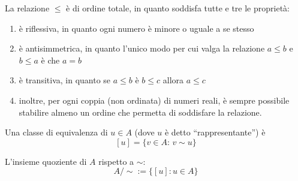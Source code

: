 {\begin{itemize}
        La relazione $ \le $ è di ordine totale, in quanto soddisfa tutte e tre le proprietà:
        \begin{enumerate}
            \item è riflessiva, in quanto ogni numero è minore o uguale a se stesso
            \item è antisimmetrica, in quanto l’unico modo per cui valga la relazione $ a\le b $ e $ b \le a $ è che $a=b$
            \item è transitiva, in quanto se $a\le b$ è $b\le c$ allora $a\le c$
            \item inoltre, per ogni coppia (non ordinata) di numeri reali, è sempre possibile stabilire almeno un ordine che permetta di soddisfare la relazione.
        \end{enumerate}
    \end{itemize}
}


Una classe di equivalenza di $ u \in A $ (dove $ u $ è detto ``rappresentante'') è
\[
    [u]=\{v \in A:\, v \sim u\}
\]

L'insieme quoziente di $ A $ rispetto a $ \sim $: \[
    A/\sim := \{[u]: u \in A\}
\]